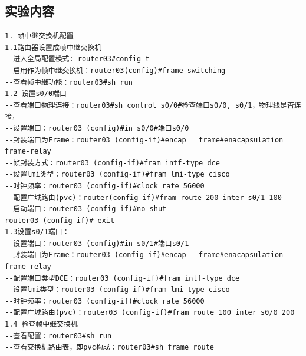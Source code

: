 \documentclass[lang=cn,11pt,a4paper,cite=authoryear]{elegantpaper}
\begin{document}
\subsection{实验内容}

\begin{lstlisting}
1. 帧中继交换机配置
1.1路由器设置成帧中继交换机
--进入全局配置模式: router03#config t
--启用作为帧中继交换机：router03(config)#frame switching
--查看帧中继功能：router03#sh run
1.2 设置s0/0端口
--查看端口物理连接：router03#sh control s0/0#检查端口s0/0, s0/1，物理线是否连接，
--设置端口：router03 (config)#in s0/0#端口s0/0
--封装端口为Frame：router03 (config-if)#encap   frame#enacapsulation frame-relay 
--帧封装方式：router03 (config-if)#fram intf-type dce 
--设置lmi类型：router03 (config-if)#fram lmi-type cisco 
--时钟频率：router03 (config-if)#clock rate 56000
--配置广域路由(pvc)：router(config-if)#fram route 200 inter s0/1 100
--启动端口：router03 (config-if)#no shut
router03 (config-if)# exit
1.3设置s0/1端口：
--设置端口：router03 (config)#in s0/1#端口s0/1
--封装端口为Frame：router03 (config-if)#encap   frame#enacapsulation frame-relay 
--配置端口类型DCE：router03 (config-if)#fram intf-type dce 
--设置lmi类型：router03 (config-if)#fram lmi-type cisco 
--时钟频率：router03 (config-if)#clock rate 56000
--配置广域路由(pvc)：router03 (config-if)#fram route 100 inter s0/0 200
1.4 检查帧中继交换机
--查看配置：router03#sh run
--查看交换机路由表，即pvc构成：router03#sh frame route
\end{lstlisting}
\end{document}
